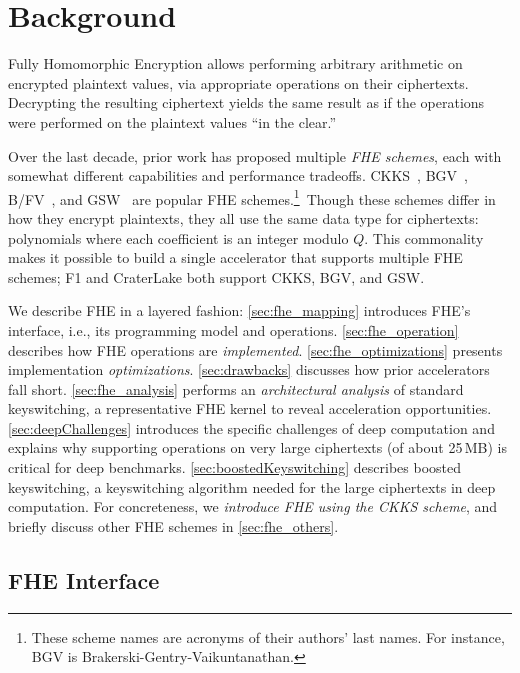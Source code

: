 \chapter{Background}\label{sec:background}

Fully Homomorphic Encryption allows performing arbitrary
arithmetic on encrypted plaintext values, via appropriate operations
on their ciphertexts. Decrypting the resulting ciphertext yields the
same result as if the operations were performed on the plaintext
values ``in the clear.''

Over the last decade, prior work has proposed multiple \emph{FHE schemes}, each
with somewhat different capabilities and performance tradeoffs.
CKKS~\cite{cheon:ictaci17:homomorphic}, BGV~\cite{brakerski:toct14:leveled},
B/FV~\cite{brakerski:crypto12:fully,fan:iacr12:somewhat}, and
GSW~\cite{gentry:crypto13:homomorphic} are popular FHE schemes.\footnote{These
scheme names are acronyms of their authors' last names. For instance, BGV is
Brakerski-Gentry-Vaikuntanathan.}~Though these schemes differ in how they
encrypt plaintexts, they all use the same data type for ciphertexts:
polynomials where each coefficient is an integer modulo $Q$. This commonality
makes it possible to build a single accelerator that supports multiple FHE
schemes; F1 and CraterLake both support CKKS, BGV, and GSW.

We describe FHE in a layered fashion: \autoref{sec:fhe_mapping} introduces
FHE's interface, i.e., its programming model and operations.
\autoref{sec:fhe_operation} describes how FHE operations are
\emph{implemented}. \autoref{sec:fhe_optimizations} presents implementation
\emph{optimizations}. \autoref{sec:drawbacks} discusses how prior accelerators
fall short. \autoref{sec:fhe_analysis} performs an \emph{architectural
analysis} of standard keyswitching, a representative FHE kernel to reveal
acceleration opportunities. \autoref{sec:deepChallenges} introduces the
specific challenges of deep computation and explains why supporting operations
on very large ciphertexts (of about 25\,MB) is critical for deep
benchmarks. \autoref{sec:boostedKeyswitching} describes boosted keyswitching, a
keyswitching algorithm needed for the large ciphertexts in deep computation.
 For concreteness, we \emph{introduce FHE
using the CKKS scheme}, and briefly discuss other FHE schemes in
\autoref{sec:fhe_others}.

\section{FHE Interface}
\label{sec:fhe_mapping}

